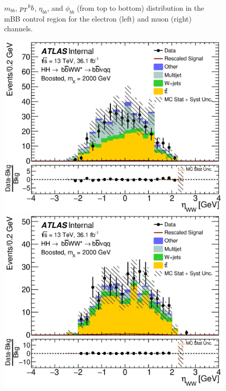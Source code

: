 \begin{figure}[h]
\begin{center}
\caption[Kinematic distributions in the mBB control region for the electron and muon channels]{${m_{bb}}$, ${\pt^bb}$,  ${\eta_{bb}}$, and ${\phi_{bb}}$ (from top to bottom) distribution in the mBB control region for the electron (left) and muon (right) channels.}
\end{center}
\end{figure}

\newpage

\begin{figure}[h]
\begin{center}
\includegraphics[scale=0.33]{figures/kinplots/new/C_2tag_mbbcr_elec_presel_met50_WWEta}
\includegraphics[scale=0.33]{figures/kinplots/new/C_2tag_mbbcr_muon_presel_met50_WWEta}\\

\end{center}
\end{figure}
